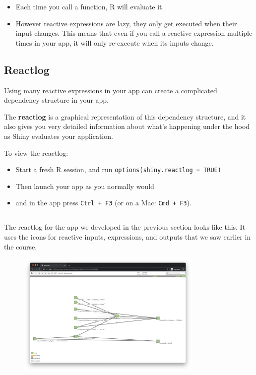 \documentclass[
  letterpaper,
  DIV=11,
  numbers=noendperiod]{scrreprt}
\providecommand{\tightlist}{%
  \setlength{\itemsep}{0pt}\setlength{\parskip}{0pt}}
\begin{document}
\begin{itemize}
\item
  Each time you call a function, R will evaluate it.
\item
  However reactive expressions are lazy, they only get executed when
  their input changes. This means that even if you call a reactive
  expression multiple times in your app, it will only re-execute when
  its inputs change.
\end{itemize}

\hypertarget{reactlog}{%
\subsection{Reactlog}\label{reactlog}}

Using many reactive expressions in your app can create a complicated
dependency structure in your app.

The \textbf{reactlog} is a graphical representation of this dependency
structure, and it also gives you very detailed information about what's
happening under the hood as Shiny evaluates your application.

To view the reactlog:

\begin{itemize}
\tightlist
\item
  Start a fresh R session, and run
  \texttt{options(shiny.reactlog\ =\ TRUE)}
\item
  Then launch your app as you normally would
\item
  and in the app press \texttt{Ctrl\ +\ F3} (or on a Mac:
  \texttt{Cmd\ +\ F3}).
\end{itemize}

\hypertarget{section-47}{%
\subsection{}\label{section-47}}

The reactlog for the app we developed in the previous section looks like
this. It uses the icons for reactive inputs, expressions, and outputs
that we saw earlier in the course.

\begin{figure}

{\centering \includegraphics[width=0.8\textwidth,height=\textheight]{./images/reactlog.png}

}

\end{figure}
\end{document}

